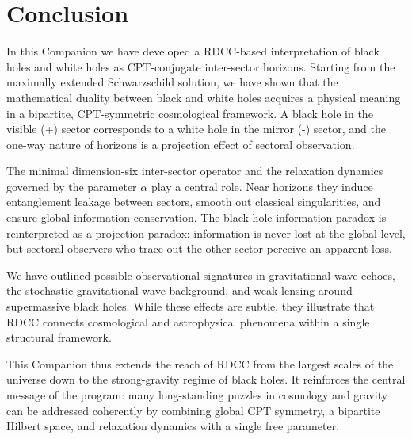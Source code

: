 \documentclass[11pt,a4paper]{article}
\begin{document}
\section{Conclusion}

In this Companion we have developed a RDCC-based interpretation of black holes and white holes as CPT-conjugate inter-sector horizons. Starting from the maximally extended Schwarzschild solution, we have shown that the mathematical duality between black and white holes acquires a physical meaning in a bipartite, CPT-symmetric cosmological framework. A black hole in the visible (+) sector corresponds to a white hole in the mirror (-) sector, and the one-way nature of horizons is a projection effect of sectoral observation.

The minimal dimension-six inter-sector operator and the relaxation dynamics governed by the parameter \(\alpha\) play a central role. Near horizons they induce entanglement leakage between sectors, smooth out classical singularities, and ensure global information conservation. The black-hole information paradox is reinterpreted as a projection paradox: information is never lost at the global level, but sectoral observers who trace out the other sector perceive an apparent loss.

We have outlined possible observational signatures in gravitational-wave echoes, the stochastic gravitational-wave background, and weak lensing around supermassive black holes. While these effects are subtle, they illustrate that RDCC connects cosmological and astrophysical phenomena within a single structural framework.

This Companion thus extends the reach of RDCC from the largest scales of the universe down to the strong-gravity regime of black holes. It reinforces the central message of the program: many long-standing puzzles in cosmology and gravity can be addressed coherently by combining global CPT symmetry, a bipartite Hilbert space, and relaxation dynamics with a single free parameter.


\nocite{*}

\end{document}
